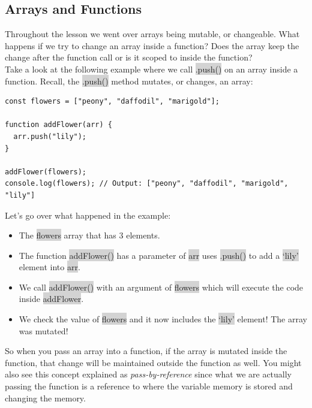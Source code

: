 \documentclass[11pt]{article}
\begin{document}
\subsection{Arrays and Functions}
Throughout the lesson we went over arrays being mutable, or changeable. What happens if we try to change an array inside a function? Does the array keep the change after the function call or is it scoped to inside the function? \\
\newline
Take a look at the following example where we call \colorbox{lightgray}{.push()} on an array inside a function. Recall, the \colorbox{lightgray}{.push()} method mutates, or changes, an array:
\begin{lstlisting}
const flowers = ["peony", "daffodil", "marigold"];

function addFlower(arr) {
  arr.push("lily");
}

addFlower(flowers);
console.log(flowers); // Output: ["peony", "daffodil", "marigold", "lily"]
\end{lstlisting}
Let’s go over what happened in the example:
\begin{itemize}[leftmargin = *]
\item The \colorbox{lightgray}{flowers} array that has 3 elements.
\item The function \colorbox{lightgray}{addFlower()} has a parameter of \colorbox{lightgray}{arr} uses \colorbox{lightgray}{.push()} to add a \colorbox{lightgray}{`lily'} element into \colorbox{lightgray}{arr}.
\item We call \colorbox{lightgray}{addFlower()} with an argument of \colorbox{lightgray}{flowers} which will execute the code inside \colorbox{lightgray}{addFlower}.
\item We check the value of \colorbox{lightgray}{flowers} and it now includes the \colorbox{lightgray}{`lily'} element! The array was mutated!
\end{itemize}
So when you pass an array into a function, if the array is mutated inside the function, that change will be maintained outside the function as well. You might also see this concept explained as \textit{pass-by-reference} since what we are actually passing the function is a reference to where the variable memory is stored and changing the memory.
\end{document}
